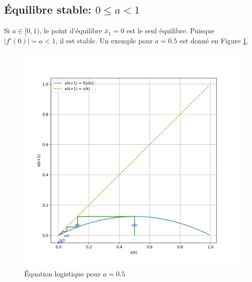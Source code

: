         \subsection{Équilibre stable: $0 \leq a < 1$}
            Si $a \in [0, 1)$, le point d'équilibre $\bar{x}_1 = 0$ est le seul équilibre. Puisque $|f'(0)| = a < 1$, il est stable. Un exemple pour $a=0.5$ est donné en Figure \ref{fig:logistique_differences_1}.
            \begin{figure}[ht!]
                \centering
                \includegraphics[width=\textwidth]{images/logistique_differences_1.jpg}
                \caption{Équation logistique pour $a=0.5$}
                \label{fig:logistique_differences_1}
            \end{figure}
            
